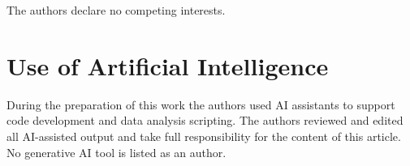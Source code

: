 \documentclass[11pt,a4paper]{article}
\begin{document}
The authors declare no competing interests.

\section*{Use of Artificial Intelligence}

During the preparation of this work the authors used AI assistants to support code development and data analysis scripting. The authors reviewed and edited all AI-assisted output and take full responsibility for the content of this article. No generative AI tool is listed as an author.




\end{document}
